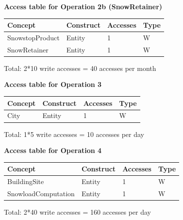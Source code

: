 \documentclass{article}[h]
\begin{document}
{{\vspace{12px}

{\centering \textbf{Access table for Operation 2b (SnowRetainer)}\\}
\begin{table}[H]
  \def\arraystretch{1.10}%
  \centering
  \begin{tabular}{ | m{4cm} | m{4cm}| m{3cm} | m{2cm} |} 
    \hline
    {\textbf{\large Concept}} & {\textbf{\large Construct}} & {\textbf{\large Accesses}} & {\textbf{\large Type}} \\
    \hline
    \color[HTML]{3531FF} SnowstopProduct & Entity & 1 & W \\ 
    \hline
    \color[HTML]{3531FF} SnowRetainer & Entity & 1 & W \\ 
    \hline
  \end{tabular}
\end{table}
Total: 2*10 write accesses = 40 accesses per month

\vspace{12px}

{\centering \textbf{Access table for Operation 3}\\}
\begin{table}[H]
  \def\arraystretch{1.10}%
  \centering
  \begin{tabular}{ | m{4cm} | m{4cm}| m{3cm} | m{2cm} |} 
    \hline
    {\textbf{\large Concept}} & {\textbf{\large Construct}} & {\textbf{\large Accesses}} & {\textbf{\large Type}} \\
    \hline
    \color[HTML]{3531FF} City & Entity & 1 & W \\ 
    \hline
  \end{tabular}
\end{table}
Total: 1*5 write accesses = 10 accesses per day

\vspace{12px}

{\centering \textbf{Access table for Operation 4}\\}
\begin{table}[H]
  \def\arraystretch{1.10}%
  \centering
  \begin{tabular}{ | m{4cm} | m{4cm}| m{3cm} | m{2cm} |} 
    \hline
    {\textbf{\large Concept}} & {\textbf{\large Construct}} & {\textbf{\large Accesses}} & {\textbf{\large Type}} \\
    \hline
    \color[HTML]{3531FF} BuildingSite & Entity & 1 & W \\ 
    \hline
    \color[HTML]{3531FF} SnowloadComputation & Entity & 1 & W \\ 
    \hline
  \end{tabular}
\end{table}
Total: 2*40 write accesses = 160 accesses per day

}}
\end{document}
